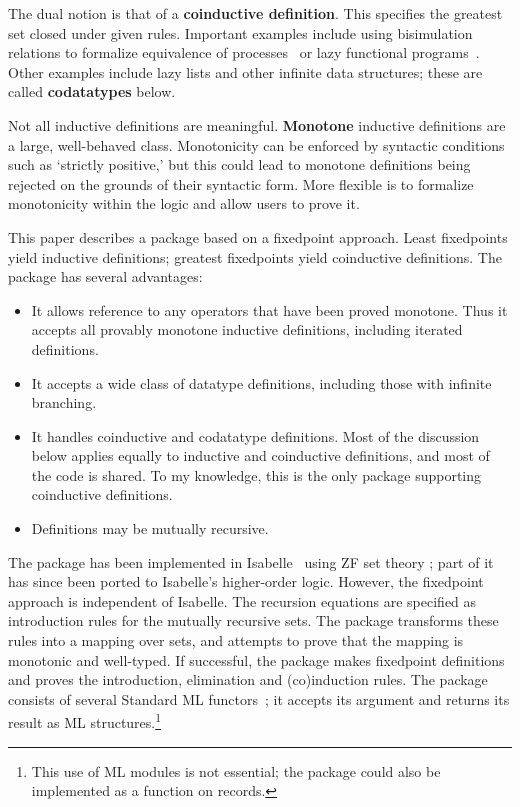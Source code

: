 The dual notion is that of a {\bf coinductive definition}.  This specifies
the greatest set closed under given rules.  Important examples include
using bisimulation relations to formalize equivalence of
processes~\cite{milner89} or lazy functional programs~\cite{abramsky90}.
Other examples include lazy lists and other infinite data structures; these
are called {\bf codatatypes} below.

Not all inductive definitions are meaningful.  {\bf Monotone} inductive
definitions are a large, well-behaved class.  Monotonicity can be enforced
by syntactic conditions such as `strictly positive,' but this could lead to
monotone definitions being rejected on the grounds of their syntactic form.
More flexible is to formalize monotonicity within the logic and allow users
to prove it.

This paper describes a package based on a fixedpoint approach.  Least
fixedpoints yield inductive definitions; greatest fixedpoints yield
coinductive definitions.  The package has several advantages:
\begin{itemize}
\item It allows reference to any operators that have been proved monotone.
  Thus it accepts all provably monotone inductive definitions, including
  iterated definitions.
\item It accepts a wide class of datatype definitions, including those with
  infinite branching.
\item It handles coinductive and codatatype definitions.  Most of
  the discussion below applies equally to inductive and coinductive
  definitions, and most of the code is shared.  To my knowledge, this is
  the only package supporting coinductive definitions.
\item Definitions may be mutually recursive.
\end{itemize}
The package has been implemented in Isabelle~\cite{isabelle-intro} using ZF
set theory \cite{paulson-set-I,paulson-set-II}; part of it has since been
ported to Isabelle's higher-order logic.  However, the fixedpoint approach is
independent of Isabelle.  The recursion equations are specified as
introduction rules for the mutually recursive sets.  The package transforms
these rules into a mapping over sets, and attempts to prove that the
mapping is monotonic and well-typed.  If successful, the package makes
fixedpoint definitions and proves the introduction, elimination and
(co)induction rules.  The package consists of several Standard ML
functors~\cite{paulson91}; it accepts its argument and returns its result
as ML structures.\footnote{This use of ML modules is not essential; the
  package could also be implemented as a function on records.}

